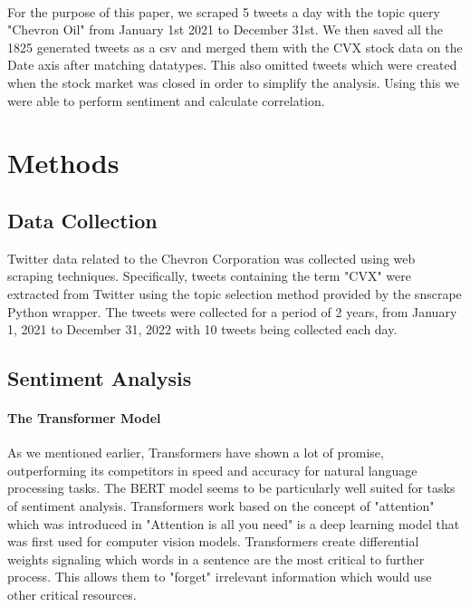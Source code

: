\documentclass[12pt, letterpaper, titlepage]{article}
\begin{document}
\paragraph{}
	For the purpose of this paper, we scraped 5 tweets a day with the topic query "Chevron Oil" from January 1st 2021 to December 31st.  We then saved all the 1825 generated tweets as a csv and merged them with the CVX stock data on the Date axis after matching datatypes. This also omitted tweets which were created when the stock market was closed in order to simplify the analysis. Using this we were able to perform sentiment and calculate correlation.


\label{sec: methods}
\section{Methods}

\subsection{Data Collection}
Twitter data related to the Chevron Corporation was collected using web scraping techniques. Specifically, tweets containing the term "CVX" were extracted from Twitter using the topic selection method provided by the snscrape\citep{justanotherarchivist_2022} Python wrapper. The tweets were collected for a period of 2 years, from January 1, 2021 to December 31, 2022 with 10 tweets being collected each day.

\subsection{Sentiment Analysis}
\paragraph{The Transformer Model}
	As we mentioned earlier, Transformers have shown a lot of promise, outperforming its competitors in speed and accuracy for natural language processing tasks. The BERT model seems to be particularly well suited for tasks of sentiment analysis. Transformers work based on the concept of "attention" which was introduced in "Attention is all you need" \citep{vaswani2017attention} is a deep learning model that was first used for computer vision models. Transformers create differential weights signaling which words in a sentence are the most critical to further process. This allows them to "forget"  irrelevant information which would use other critical resources.
	
\end{document}
